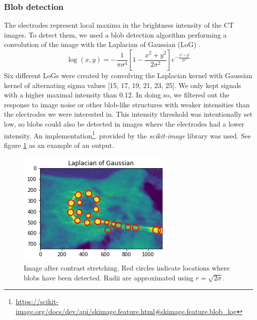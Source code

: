 \documentclass[a4paper, 10pt, twocolumn]{article}
\begin{document}
\subsubsection{Blob detection}
The electrodes represent local maxima in the brightness intensity of the CT images. To detect them, we used a blob detection algorithm performing a convolution of the image with the Laplacian of Gaussian (LoG) \cite{LoG}. 
$$
\log(x, y)=-\frac{1}{\pi \sigma^{4}}\left[1-\frac{x^{2}+y^{2}}{2 \sigma^{2}}\right] e^{-\frac{x^{2}+y^{2}}{2 \sigma^{2}}}
$$
Six different LoGs were created by convolving the Laplacian kernel with Gaussian kernel of alternating sigma values [15, 17, 19, 21, 23, 25]. We only kept signals with a higher maximal intensity than 0.12. In doing so, we filtered out the response to image noise or other blob-like structures with weaker intensities than the electrodes we were interested in. This intensity threshold was intentionally set low, so blobs could also be detected in images where the electrodes had a lower intensity. An implementation\footnote{\url{https://scikit-image.org/docs/dev/api/skimage.feature.html#skimage.feature.blob_log}}.
provided by the \emph{scikit-image} \cite{scikit-image} library was used.
See figure \ref{blobs_detected} as an example of an output.
\begin{figure}[ht]
	\centering
  \includegraphics[width=.5\textwidth]{blobs_detected.png}
	\caption{Image after contrast stretching. Red circles indicate locations where blobs have been detected. Radii are approximated using $r=\sqrt{2 \sigma }$.}
	\label{blobs_detected}
\end{figure}
\end{document}
